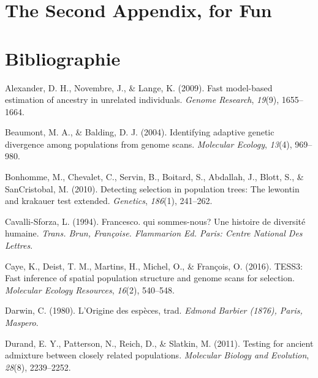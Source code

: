 \documentclass[12pt,twoside]{reedthesis}
\begin{document}
  \chapter{The Second Appendix, for
  Fun}\label{the-second-appendix-for-fun}
  
  \backmatter
  
  \chapter*{Bibliographie}\label{bibliographie}
  
  \noindent
  
  \setlength{\parindent}{-0.20in} \setlength{\leftskip}{0.20in}
  \setlength{\parskip}{8pt}
  
  \hypertarget{refs}{}
  \hypertarget{ref-alexander2009fast}{}
  Alexander, D. H., Novembre, J., \& Lange, K. (2009). Fast model-based
  estimation of ancestry in unrelated individuals. \emph{Genome Research},
  \emph{19}(9), 1655--1664.
  
  \hypertarget{ref-beaumont2004identifying}{}
  Beaumont, M. A., \& Balding, D. J. (2004). Identifying adaptive genetic
  divergence among populations from genome scans. \emph{Molecular
  Ecology}, \emph{13}(4), 969--980.
  
  \hypertarget{ref-bonhomme2010detecting}{}
  Bonhomme, M., Chevalet, C., Servin, B., Boitard, S., Abdallah, J.,
  Blott, S., \& SanCristobal, M. (2010). Detecting selection in population
  trees: The lewontin and krakauer test extended. \emph{Genetics},
  \emph{186}(1), 241--262.
  
  \hypertarget{ref-cavalli1994francesco}{}
  Cavalli-Sforza, L. (1994). Francesco. qui sommes-nous? Une histoire de
  diversité humaine. \emph{Trans. Brun, Françoise. Flammarion Ed. Paris:
  Centre National Des Lettres}.
  
  \hypertarget{ref-caye2016tess3}{}
  Caye, K., Deist, T. M., Martins, H., Michel, O., \& François, O. (2016).
  TESS3: Fast inference of spatial population structure and genome scans
  for selection. \emph{Molecular Ecology Resources}, \emph{16}(2),
  540--548.
  
  \hypertarget{ref-darwin1980origine}{}
  Darwin, C. (1980). L'Origine des espèces, trad. \emph{Edmond Barbier
  (1876), Paris, Maspero}.
  
  \hypertarget{ref-durand2011testing}{}
  Durand, E. Y., Patterson, N., Reich, D., \& Slatkin, M. (2011). Testing
  for ancient admixture between closely related populations.
  \emph{Molecular Biology and Evolution}, \emph{28}(8), 2239--2252.
  
\end{document}
